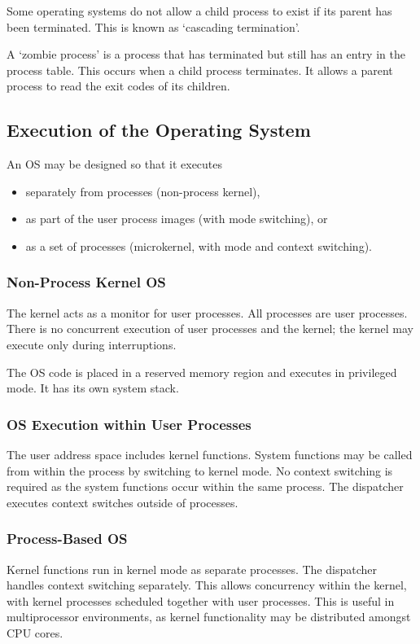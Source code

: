 Some operating systems do not allow a child process to exist if its parent has been terminated.
This is known as `cascading termination'.

A `zombie process' is a process that has terminated but still has an entry in the process table.
This occurs when a child process terminates.
It allows a parent process to read the exit codes of its children.

\subsection{Execution of the Operating System}

An OS may be designed so that it executes
\begin{itemize}
  \item separately from processes (non-process kernel),
  \item as part of the user process images (with mode switching), or
  \item as a set of processes (microkernel, with mode and context switching).
\end{itemize}

\subsubsection{Non-Process Kernel OS}

The kernel acts as a monitor for user processes.
All processes are user processes.
There is no concurrent execution of user processes and the kernel; the kernel may execute only during interruptions.

The OS code is placed in a reserved memory region and executes in privileged mode.
It has its own system stack.

\subsubsection{OS Execution within User Processes}

The user address space includes kernel functions.
System functions may be called from within the process by switching to kernel mode.
No context switching is required as the system functions occur within the same process.
The dispatcher executes context switches outside of processes.

\subsubsection{Process-Based OS}

Kernel functions run in kernel mode as separate processes.
The dispatcher handles context switching separately.
This allows concurrency within the kernel, with kernel processes scheduled together with user processes.
This is useful in multiprocessor environments, as kernel functionality may be distributed amongst CPU cores.
